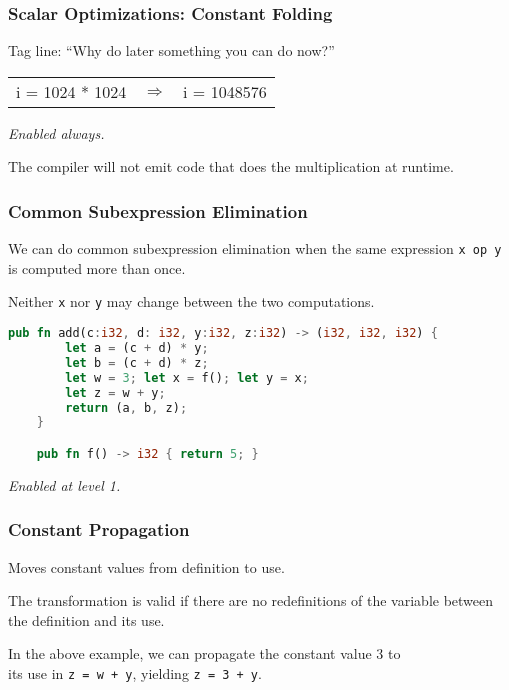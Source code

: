 \begin{frame}
\frametitle{Scalar Optimizations: Constant Folding}

Tag line: ``Why do later something you can do now?''

\begin{center}
\vspace*{-1em}
\begin{tabular}{lll}
i = 1024 * 1024 &
$\Longrightarrow$ &
i = 1048576
\end{tabular}
\end{center}

\emph{Enabled always.}

The compiler will not emit code that does the multiplication at runtime.

\end{frame}


\begin{frame}[fragile]
\frametitle{Common Subexpression Elimination}

We can do common subexpression elimination
when the same expression {\tt x~op~y} is computed more than once. 

Neither {\tt x} nor {\tt y} may change between the two computations. 


\begin{lstlisting}[language=Rust]
    pub fn add(c:i32, d: i32, y:i32, z:i32) -> (i32, i32, i32) {
        let a = (c + d) * y;
        let b = (c + d) * z;
        let w = 3; let x = f(); let y = x;
        let z = w + y;
        return (a, b, z);
    }

    pub fn f() -> i32 { return 5; }
\end{lstlisting}

\noindent \emph{Enabled at level 1.}

\end{frame}

\begin{frame}
\frametitle{Constant Propagation}

Moves constant values from definition to
use. 

The transformation is valid if there are no redefinitions of the
variable between the definition and its use.

 In the above example,
we can propagate the constant value 3 to \\
its use in {\tt z = w + y},
yielding {\tt z = 3 + y}.



\end{frame}

